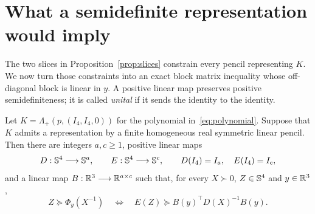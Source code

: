 \section{What a semidefinite representation would imply}
\label{sec:pencil}

The two slices in Proposition~\ref{prop:slices} constrain every pencil
representing $K$.  We now turn those constraints into an exact block
matrix inequality whose off-diagonal block is linear in $y$.
A positive linear map preserves positive semidefiniteness; it is
called \emph{unital} if it sends the identity to the identity.

\begin{proposition}\label{prop:pencil}
Let $K=\Lambda_+(p,(I_4,I_4,0))$ for the polynomial
in~\eqref{eq:polynomial}. Suppose that $K$ admits a representation by a finite homogeneous real
symmetric linear pencil.  Then there are integers $a,c\geq1$, positive
linear maps
\[
 D:\mathbb S^4\longrightarrow\mathbb S^a,
 \qquad E:\mathbb S^4\longrightarrow\mathbb S^c,
 \qquad D(I_4)=I_a,\quad E(I_4)=I_c,
\]
and a linear map $B:\mathbb R^3\longrightarrow\mathbb R^{a\times c}$ such that, for
every $X\succ0$, $Z\in\mathbb S^4$ and $y\in\mathbb R^3$,
\begin{equation}\label{eq:schur-equivalence}
 Z\succeq\Phi_y(X^{-1})
 \quad\Longleftrightarrow\quad
 E(Z)\succeq B(y)^\top D(X)^{-1}B(y).
\end{equation}
\end{proposition}

